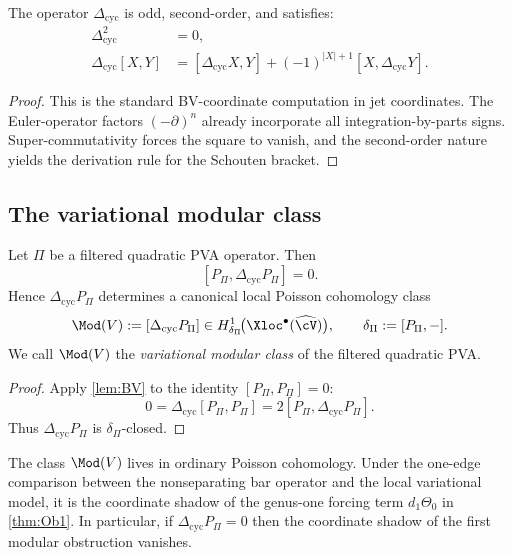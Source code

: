 \begin{lemma}\label{lem:BV}
The operator $\Delta_{\mathrm{cyc}}$ is odd, second-order, and satisfies:
\begin{align*}
\Delta_{\mathrm{cyc}}^2&=0,\\
\Delta_{\mathrm{cyc}}[X,Y]
&=
[\Delta_{\mathrm{cyc}}X,Y]
+(-1)^{|X|+1}[X,\Delta_{\mathrm{cyc}}Y].
\end{align*}
\end{lemma}

\begin{proof}
This is the standard BV-coordinate computation in jet coordinates. The Euler-operator
factors $(-\partial)^n$ already incorporate all integration-by-parts signs. Super-commutativity
forces the square to vanish, and the second-order nature yields the derivation rule for the
Schouten bracket.
\end{proof}

\subsection{The variational modular class}

\begin{theorem}\label{thm:modclass}
Let $\Pi$ be a filtered quadratic PVA operator. Then
\[
[P_\Pi,\Delta_{\mathrm{cyc}}P_\Pi]=0.
\]
Hence $\Delta_{\mathrm{cyc}}P_\Pi$ determines a canonical local Poisson cohomology class
\[
\Mod(V):=[\Delta_{\mathrm{cyc}}P_\Pi]\in
H^1_{\delta_\Pi}\!\big(\Xloc^\bullet(\widehat{\cV})\big),
\qquad
\delta_\Pi:=[P_\Pi,-].
\]
We call $\Mod(V)$ the \emph{variational modular class} of the filtered quadratic PVA.
\end{theorem}

\begin{proof}
Apply \cref{lem:BV} to the identity $[P_\Pi,P_\Pi]=0$:
\[
0=\Delta_{\mathrm{cyc}}[P_\Pi,P_\Pi]=2[P_\Pi,\Delta_{\mathrm{cyc}}P_\Pi].
\]
Thus $\Delta_{\mathrm{cyc}}P_\Pi$ is $\delta_\Pi$-closed.
\end{proof}

\begin{remark}
The class $\Mod(V)$ lives in ordinary Poisson cohomology. Under the one-edge comparison
between the nonseparating bar operator and the local variational model, it is the coordinate
shadow of the genus-one forcing term $d_1\Theta_0$ in \cref{thm:Ob1}. In particular, if
$\Delta_{\mathrm{cyc}}P_\Pi=0$ then the coordinate shadow of the first modular obstruction
vanishes.
\end{remark}


